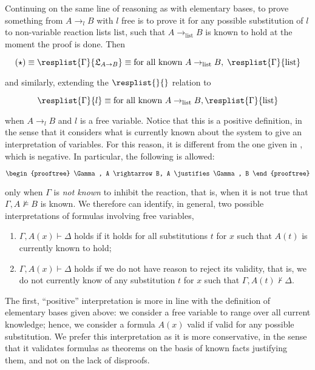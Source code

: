 Continuing on the same line of reasoning as with elementary bases, to prove
something from $A \rightarrow_l B$ with $l$ free is to prove it for any
possible substitution of $l$ to non-variable
reaction lists $\mathrm{list}$, such that
$A \rightarrow_{\mathrm{list}} B$ is known to hold at the moment the
proof is done.
Then

\[
  (\star) \equiv
  \resplist{\Gamma}{\mathfrak{L}_{A \rightarrow B}} \equiv
  \text{for all known } A \rightarrow_{\mathrm{list}} B,
  \; \resplist{\Gamma}{\mathrm{list}}
\]

and similarly, extending the $\resplist{}{}$ relation to

\[
  \resplist{\Gamma}{l} \equiv
  \text{for all known } A \rightarrow_{\mathrm{list}} B,
  \resplist{\Gamma}{\mathrm{list}}
\]

when $A \rightarrow_l B$ and $l$ is a free variable. Notice that this is a
positive definition, in the sense that it considers what is currently known
about the system to give an interpretation of variables.
For this reason, it is different from the one given in \cite{adding-logic},
which is negative. In particular, the following is allowed:

\[
  \begin{prooftree}
    \Gamma, A \rightarrow B, A
    \justifies
    \Gamma, B
  \end{prooftree}
\]

only when $\Gamma$ is \emph{not known} to inhibit the reaction, that is, when it
is not true that $\Gamma, A \not \models B$ is known. We therefore can
identify, in general, two possible interpretations of formulas involving free
variables,

\begin{enumerate}
\item $\Gamma, A(x) \vdash \Delta$ holds if it holds for all substitutions $t$
  for $x$ such that $A(t)$ is currently known to hold;
\item $\Gamma, A(x) \vdash \Delta$ holds if we do not have reason to reject its
  validity, that is, we do not currently know of any substitution $t$ for $x$
  such that $\Gamma, A(t) \not \vdash \Delta$.
\end{enumerate}

The first, ``positive'' interpretation is more in line with the definition of
elementary bases given above: we consider a free variable to range over all
current knowledge; hence, we consider a formula $A(x)$ valid if valid for any
possible substitution. We prefer this interpretation as it is more conservative,
in the sense that it validates formulas as theorems on the basis of known facts
justifying them, and not on the lack of disproofs.

